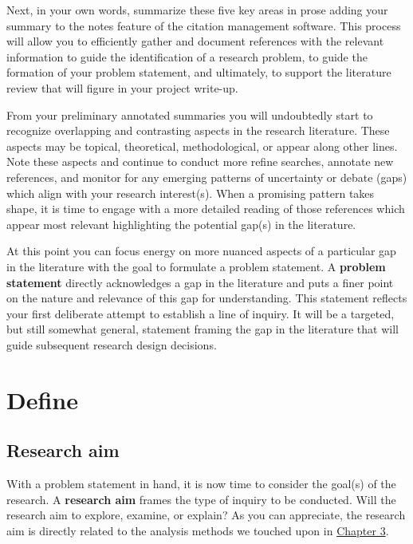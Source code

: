 \documentclass[
  letterpaper,
]{latex/krantz}
\theoremstyle{definition}
\theoremstyle{remark}
\begin{document}
Next, in your own words, summarize these five key areas in prose adding
your summary to the notes feature of the citation management software.
This process will allow you to efficiently gather and document
references with the relevant information to guide the identification of
a research problem, to guide the formation of your problem statement,
and ultimately, to support the literature review that will figure in
your project write-up.

From your preliminary annotated summaries you will undoubtedly start to
recognize overlapping and contrasting aspects in the research
literature. These aspects may be topical, theoretical, methodological,
or appear along other lines. Note these aspects and continue to conduct
more refine searches, annotate new references, and monitor for any
emerging patterns of uncertainty or debate (gaps) which align with your
research interest(s). When a promising pattern takes shape, it is time
to engage with a more detailed reading of those references which appear
most relevant highlighting the potential gap(s) in the literature.

At this point you can focus energy on more nuanced aspects of a
particular gap in the literature with the goal to formulate a problem
statement. A \textbf{problem statement} directly acknowledges a gap in
the literature and puts a finer point on the nature and relevance of
this gap for understanding. This statement reflects your first
deliberate attempt to establish a line of inquiry. It will be a
targeted, but still somewhat general, statement framing the gap in the
literature that will guide subsequent research design decisions.

\section{Define}\label{sec-fr-define}

\subsection{Research aim}\label{sec-fr-aim}

With a problem statement in hand, it is now time to consider the goal(s)
of the research. A \textbf{research aim} frames the type of inquiry to
be conducted. Will the research aim to explore, examine, or explain? As
you can appreciate, the research aim is directly related to the analysis
methods we touched upon in \hyperref[sec-approaching-analysis]{Chapter
3}.
\end{document}
